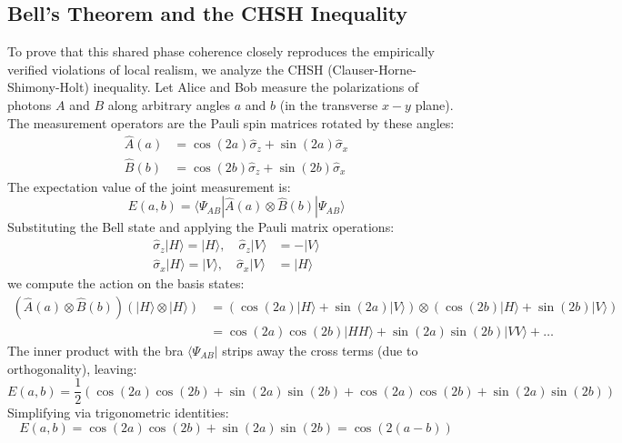 \subsection{Bell's Theorem and the CHSH Inequality}
To prove that this shared phase coherence closely reproduces the empirically verified violations of local realism, we analyze the CHSH (Clauser-Horne-Shimony-Holt) inequality. 
Let Alice and Bob measure the polarizations of photons $A$ and $B$ along arbitrary angles $a$ and $b$ (in the transverse $x-y$ plane). The measurement operators are the Pauli spin matrices rotated by these angles:
\begin{align}
\hat{A}(a) &= \cos(2a)\hat{\sigma}_z + \sin(2a)\hat{\sigma}_x \\
\hat{B}(b) &= \cos(2b)\hat{\sigma}_z + \sin(2b)\hat{\sigma}_x
\end{align}
The expectation value of the joint measurement is:
\begin{equation}
E(a,b) = \langle \Psi_{AB} | \hat{A}(a) \otimes \hat{B}(b) | \Psi_{AB} \rangle
\end{equation}
Substituting the Bell state and applying the Pauli matrix operations:
\begin{align}
\hat{\sigma}_z |H\rangle = |H\rangle, \quad \hat{\sigma}_z |V\rangle &= -|V\rangle \\
\hat{\sigma}_x |H\rangle = |V\rangle, \quad \hat{\sigma}_x |V\rangle &= |H\rangle
\end{align}
we compute the action on the basis states:
\begin{align}
(\hat{A}(a) \otimes \hat{B}(b)) (|H\rangle \otimes |H\rangle) &= (\cos(2a)|H\rangle + \sin(2a)|V\rangle) \otimes (\cos(2b)|H\rangle + \sin(2b)|V\rangle) \nonumber \\
&= \cos(2a)\cos(2b)|HH\rangle + \sin(2a)\sin(2b)|VV\rangle + \dots
\end{align}
The inner product with the bra $\langle \Psi_{AB} |$ strips away the cross terms (due to orthogonality), leaving:
\begin{equation}
E(a,b) = \frac{1}{2} \left( \cos(2a)\cos(2b) + \sin(2a)\sin(2b) + \cos(2a)\cos(2b) + \sin(2a)\sin(2b) \right)
\end{equation}
Simplifying via trigonometric identities:
\begin{equation}
E(a,b) = \cos(2a)\cos(2b) + \sin(2a)\sin(2b) = \cos(2(a-b))
\end{equation}

